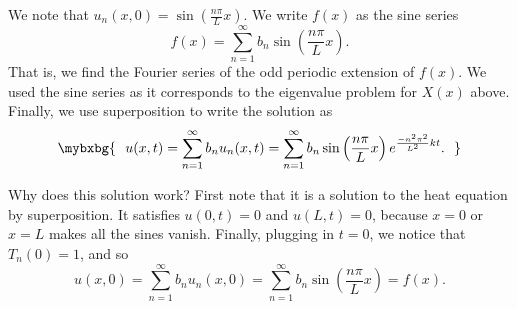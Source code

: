 We note that $u_n(x,0) = \sin \left( \frac{n \pi}{L} x \right)$.
We write $f(x)$ as the sine series
\begin{equation*}
f(x) = \sum_{n=1}^\infty b_n \sin \left(\frac{n \pi}{L}  x \right) .
\end{equation*}
That is, we find the Fourier series of the odd periodic extension of $f(x)$.
We used the sine series as it corresponds to the eigenvalue problem for
$X(x)$ above.
Finally, we use superposition to write the solution as
\begin{equation*}
\mybxbg{~~
u(x,t) = 
\sum_{n=1}^\infty
b_n
u_n(x,t)
=
\sum_{n=1}^\infty
b_n
\sin \left( \frac{n \pi}{L}  x \right)
e^{\frac{-n^2 \pi^2}{L^2} k t} .
~~}
\end{equation*}

Why does this solution work?  First note that it is a solution to
the heat equation by superposition.  It satisfies $u(0,t) = 0$
and $u(L,t) = 0$, because $x=0$ or $x=L$ makes all the sines vanish.
Finally, plugging in $t=0$, we notice that $T_n(0) = 1$, and so
\begin{equation*}
u(x,0) = 
\sum_{n=1}^\infty
b_n
u_n(x,0)
=
\sum_{n=1}^\infty
b_n
\sin \left( \frac{n \pi}{L} x \right)
=
f(x) .
\end{equation*}

